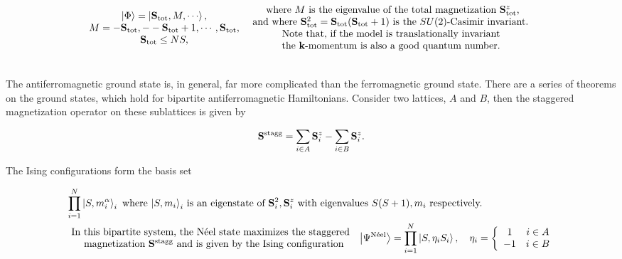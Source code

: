 \documentclass{homework}
\begin{document}
\begin{equation}
    \begin{array}{c}
         \ket{\Phi} = \ket{{\bf S}_{\textnormal{tot}}, M, \cdots},  \\
         M = -{\bf S}_{\textnormal{tot}}, - -{\bf S}_{\textnormal{tot}} +1, \cdots,  {\bf S}_{\textnormal{tot}}, \\          {\bf S}_{\textnormal{tot}} \leq NS, 
    \end{array} \begin{array}{c}
         \textnormal{ where $M$ is the eigenvalue of the total magnetization ${\bf S}_{\textnormal{tot}}^z$,}
         \\
         \textnormal{ and where ${\bf S}_{\textnormal{tot}}^2 = {\bf S}_{\textnormal{tot}}({\bf S}_{\textnormal{tot}}+1)$ is the $SU(2)$-Casimir invariant. } \\
         \textnormal{Note that, if the model is translationally invariant} \\
         \textnormal{the ${\bf k}$-momentum is also a good quantum number.}
    \end{array}
\end{equation}

\blanky \\

The antiferromagnetic ground state is, in general, far more complicated than the ferromagnetic ground state. There are a series of theorems on the ground states, which hold for bipartite antiferromagnetic Hamiltonians. Consider two lattices, $A$ and $B$, then the staggered magnetization operator on these sublattices is given by 

\begin{equation}
    {\bf S}^{\textnormal{stagg}} = \sum_{i \in A} {\bf S}_{i}^z - \sum_{i \in B} {\bf S}_{i}^z.
\end{equation}

The Ising configurations form the basis set 

\begin{align*}
&\prod_{i=1}^{N} \ket{S, m_{i}^\alpha}_{i}
     \textnormal{ where $\ket{S, m_i}_i$ is an eigenstate of ${\bf S}_i^2, {\bf S}_i^z$ with eigenvalues $S(S+1), m_i$ respectively.} \\
&\begin{array}{cc}
     \textnormal{In this bipartite system, the Néel state maximizes the staggered }  \\
     \textnormal{ magnetization ${\bf S}^{\textnormal{stagg}}$ and is given by the Ising configuration} 
\end{array}
    \ket{\Psi^{\textnormal{{Néel}}}} = \prod_{i=1}^{N} \ket{S, \eta_i S_i}, \quad \eta_i = \left\{\begin{array}{cc}
        1 & i \in A  \\
        -1 & i \in B
    \end{array} \right.
\end{align*}
\end{document}
